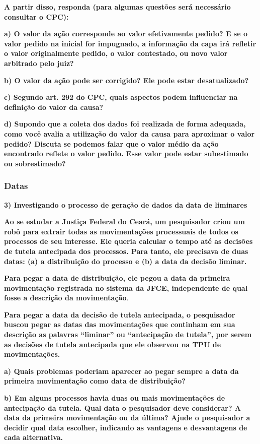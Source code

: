 \documentclass[
  letterpaper,
  DIV=11,
  numbers=noendperiod]{scrartcl}
\begin{document}
\textbf{A partir disso, responda (para algumas questões será necessário
consultar o CPC):}

\textbf{a) O valor da ação corresponde ao valor efetivamente pedido? E
se o valor pedido na inicial for impugnado, a informação da capa irá
refletir o valor originalmente pedido, o valor contestado, ou novo valor
arbitrado pelo juiz?}

\textbf{b) O valor da ação pode ser corrigido? Ele pode estar
desatualizado?}

\textbf{c) Segundo art. 292 do CPC, quais aspectos podem influenciar na
definição do valor da causa?}

\textbf{d) Supondo que a coleta dos dados foi realizada de forma
adequada, como você avalia a utilização do valor da causa para aproximar
o valor pedido? Discuta se podemos falar que o valor médio da ação
encontrado reflete o valor pedido. Esse valor pode estar subestimado ou
sobrestimado?}

\newpage{}

\hypertarget{datas}{%
\subsubsection{Datas}\label{datas}}

\textbf{3) Investigando o processo de geração de dados da data de
liminares}

\textbf{Ao se estudar a Justiça Federal do Ceará, um pesquisador criou
um robô para extrair todas as movimentações processuais de todos os
processos de seu interesse. Ele queria calcular o tempo até as decisões
de tutela antecipada dos processos. Para tanto, ele precisava de duas
datas: (a) a distribuição do processo e (b) a data da decisão liminar.}

\textbf{Para pegar a data de distribuição, ele pegou a data da primeira
movimentação registrada no sistema da JFCE, independente de qual fosse a
descrição da movimentação}.

\textbf{Para pegar a data da decisão de tutela antecipada, o pesquisador
buscou pegar as datas das movimentações que continham em sua descrição
as palavras ``liminar'' ou ``antecipação de tutela'', por serem as
decisões de tutela antecipada que ele observou na TPU de movimentações.}

\textbf{a) Quais problemas poderiam aparecer ao pegar sempre a data da
primeira movimentação como data de distribuição?}

\textbf{b) Em alguns processos havia duas ou mais movimentações de
antecipação da tutela. Qual data o pesquisador deve considerar? A data
da primeira movimentação ou da última? Ajude o pesquisador a decidir
qual data escolher, indicando as vantagens e desvantagens de cada
alternativa.}
\end{document}
